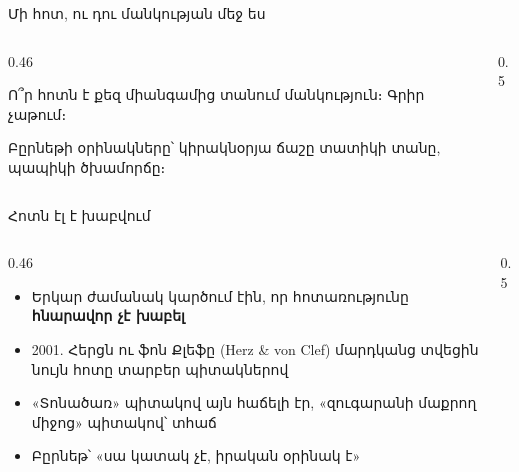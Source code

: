 \begin{frame}{Մի հոտ, ու դու մանկության մեջ ես}
  \begin{columns}[T]
    \begin{column}{0.46\textwidth}
      \begin{chatbox}
        Ո՞ր հոտն է քեզ միանգամից տանում մանկություն։ Գրիր չաթում։
      \end{chatbox}
      \vspace{1mm}
      {\small Բըրնեթի օրինակները՝ կիրակնօրյա ճաշը տատիկի տանը, պապիկի ծխամորճը։}
    \end{column}
    \begin{column}{0.5\textwidth}
    \end{column}
  \end{columns}
\end{frame}

\begin{frame}{Հոտն էլ է խաբվում}
  \begin{columns}[c]
    \begin{column}{0.46\textwidth}
      \begin{itemize}
        \item Երկար ժամանակ կարծում էին, որ հոտառությունը \textbf{հնարավոր չէ խաբել}
        \item<2-> 2001. Հերցն ու ֆոն Քլեֆը (Herz \& von Clef) մարդկանց տվեցին նույն հոտը տարբեր պիտակներով
        \item<2-> «Տոնածառ» պիտակով այն հաճելի էր, «զուգարանի մաքրող միջոց» պիտակով՝ տհաճ
        \item<3-> Բըրնեթ՝ «սա կատակ չէ, իրական օրինակ է»
      \end{itemize}
    \end{column}
    \begin{column}{0.5\textwidth}
      \centering
    \end{column}
  \end{columns}
\end{frame}


